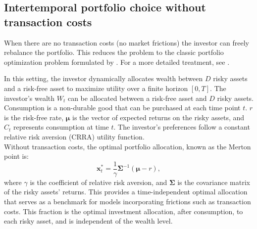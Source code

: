 \documentclass[11pt]{article}
\begin{document}
\subsection{Intertemporal portfolio choice without transaction costs} \label{Subsection: Intertemporal-Portfolio-Choice}
When there are no transaction costs (no market frictions) the investor can freely rebalance the portfolio.
This reduces the problem to the classic portfolio optimization problem formulated by \autocites{Merton1969}{Merton1971}.
For a more detailed treatment, see \autocite{Bjork}. 

In this setting, the investor dynamically allocates wealth between \(D\) risky assets and a risk-free asset to maximize utility over a finite horizon \([0,T]\).
The investor's wealth \(W_t\) can be allocated between a risk-free asset and \(D\) risky assets.
Consumption is a non-durable good that can be purchased at each time point \(t\).
\(r\) is the risk-free rate, \(\boldsymbol{\mu}\) is the vector of expected returns on the risky assets, and \(C_t\) represents consumption at time \(t\). The investor’s preferences follow a constant relative risk aversion (CRRA) utility function.\\
Without transaction costs, the optimal portfolio allocation, known as the Merton point is:
\begin{equation}
    \mathbf{x}_t^* = \frac{1}{\gamma} \boldsymbol{\Sigma}^{-1} (\boldsymbol{\mu} - r ),
\end{equation}
where \(\gamma\) is the coefficient of relative risk aversion, and \(\boldsymbol{\Sigma}\) is the covariance matrix of the risky assets' returns.
This provides a time-independent optimal allocation that serves as a benchmark for models incorporating frictions such as transaction costs.
This fraction is the optimal investment allocation, after consumption, to each risky asset, and is independent of the wealth level.
\end{document}
